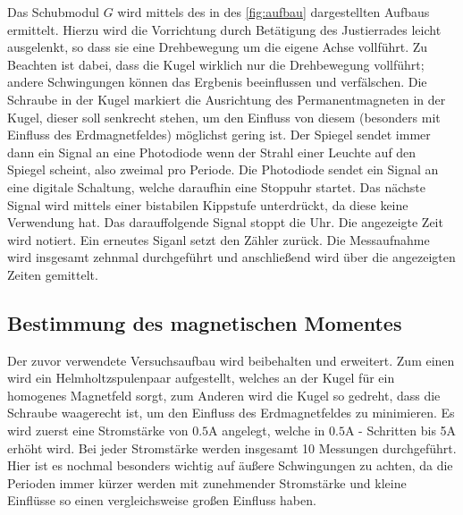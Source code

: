     Das Schubmodul $G$ wird mittels des in des \autoref{fig:aufbau} dargestellten Aufbaus ermittelt.
    Hierzu wird die Vorrichtung durch Betätigung des Justierrades leicht ausgelenkt, so dass sie eine Drehbewegung um die eigene
    Achse vollführt. Zu Beachten ist dabei, dass die Kugel wirklich nur die Drehbewegung vollführt; andere Schwingungen können
    das Ergbenis beeinflussen und verfälschen.
    Die Schraube in der Kugel markiert die Ausrichtung des Permanentmagneten in der Kugel, dieser soll senkrecht stehen, um den
    Einfluss von diesem (besonders mit Einfluss des Erdmagnetfeldes) möglichst gering ist.
    Der Spiegel sendet immer dann ein Signal an eine Photodiode wenn der Strahl einer Leuchte auf den Spiegel scheint, also zweimal pro
    Periode. Die Photodiode sendet ein Signal an eine digitale Schaltung, welche daraufhin eine Stoppuhr startet. Das nächste Signal 
    wird mittels einer bistabilen Kippstufe unterdrückt, da diese keine Verwendung hat. Das darauffolgende Signal stoppt die Uhr.
    Die angezeigte Zeit wird notiert. Ein erneutes Siganl setzt den Zähler zurück. Die Messaufnahme wird insgesamt zehnmal durchgeführt
    und anschließend wird über die angezeigten Zeiten gemittelt.
\subsection{Bestimmung des magnetischen Momentes} 
    Der zuvor verwendete Versuchsaufbau wird beibehalten und erweitert. Zum einen wird ein Helmholtzspulenpaar aufgestellt, welches
    an der Kugel für ein homogenes Magnetfeld sorgt, zum Anderen wird die Kugel so gedreht, dass die Schraube waagerecht ist, um
    den Einfluss des Erdmagnetfeldes zu minimieren. 
    Es wird zuerst eine Stromstärke von $0.5$A angelegt, welche in $0.5$A - Schritten bis 5A erhöht wird. Bei jeder Stromstärke
    werden insgesamt 10 Messungen durchgeführt. Hier ist es nochmal besonders wichtig auf äußere Schwingungen zu achten, da die
    Perioden immer kürzer werden mit zunehmender Stromstärke und kleine Einflüsse so einen vergleichsweise großen Einfluss haben.
